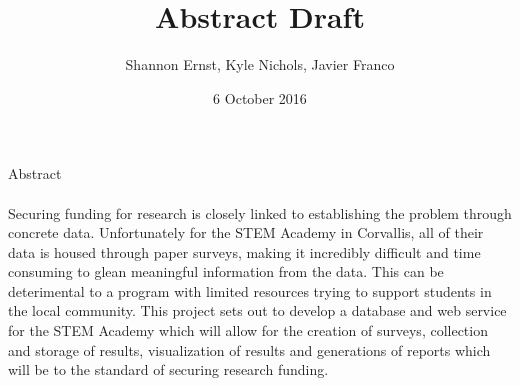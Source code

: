 \documentclass{article}
\begin{document}
\title{Abstract Draft}
\author{Shannon Ernst, Kyle Nichols, Javier Franco}
\date{6 October 2016}
\maketitle{}
\noindent Abstract\\ \\
Securing funding for research is closely linked to establishing the problem through concrete data. Unfortunately for the STEM Academy in Corvallis, all of their data is housed through paper surveys, making it incredibly difficult and time consuming to glean meaningful information from the data. This can be deterimental to a program with limited resources trying to support students in the local community. This project sets out to develop a database and web service for the STEM Academy which will allow for the creation of surveys, collection and storage of results, visualization of results and generations of reports which will be to the standard of securing research funding. 
\end{document}
